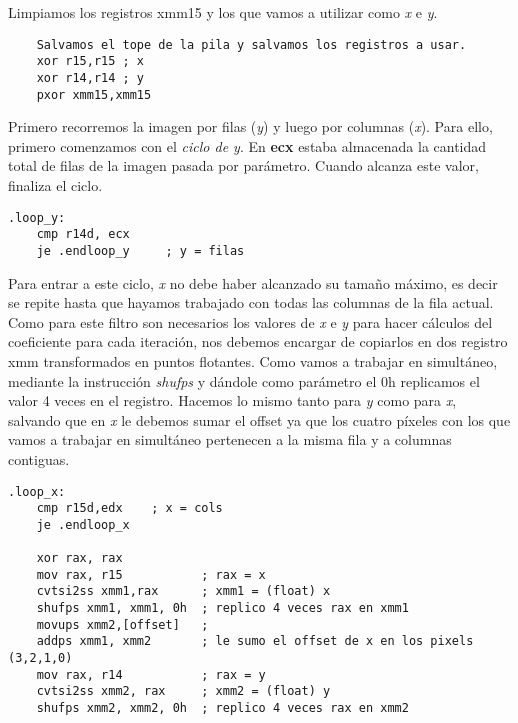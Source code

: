 \documentclass[a4paper]{article}
\begin{document}
\indent Limpiamos los registros xmm15 y los que vamos a utilizar como \emph{x} e \emph{y}.
 \begin{codesnippet}
\begin{verbatim}
    Salvamos el tope de la pila y salvamos los registros a usar.
    xor r15,r15 ; x
    xor r14,r14 ; y
    pxor xmm15,xmm15
\end{verbatim}
\end{codesnippet}

\indent Primero recorremos la imagen por filas (\emph{y}) y luego por columnas (\emph{x}). Para ello, primero comenzamos con el \textit{ciclo de y}. En \textbf{ecx} estaba almacenada la cantidad total de filas de la imagen pasada por par\'ametro. Cuando alcanza este valor, finaliza el ciclo.
 \begin{codesnippet}
\begin{verbatim}
.loop_y:
    cmp r14d, ecx
    je .endloop_y     ; y = filas
\end{verbatim}
\end{codesnippet}

\indent Para entrar a este ciclo, \emph{x} no debe haber alcanzado su tama\~no m\'aximo, es decir se repite hasta que hayamos trabajado con todas las columnas de la fila actual. Como para este filtro son necesarios los valores de \emph{x} e \emph{y} para hacer c\'alculos del coeficiente para cada iteraci\'on, nos debemos encargar de copiarlos en dos registro xmm transformados en puntos flotantes. Como vamos a trabajar en simult\'aneo, mediante la instrucci\'on \textit{shufps} y d\'andole como par\'ametro el 0h replicamos el valor 4 veces en el registro. Hacemos lo mismo tanto para \emph{y} como para \emph{x}, salvando que en \emph{x} le debemos sumar el offset ya que los cuatro p\'ixeles con los que vamos a trabajar en simult\'aneo pertenecen a la misma fila y a columnas contiguas. 
 \begin{codesnippet}
\begin{verbatim}
.loop_x:
    cmp r15d,edx    ; x = cols
    je .endloop_x

    xor rax, rax 
    mov rax, r15           ; rax = x
    cvtsi2ss xmm1,rax      ; xmm1 = (float) x
    shufps xmm1, xmm1, 0h  ; replico 4 veces rax en xmm1
    movups xmm2,[offset]   ; 
    addps xmm1, xmm2       ; le sumo el offset de x en los pixels (3,2,1,0)
    mov rax, r14           ; rax = y
    cvtsi2ss xmm2, rax     ; xmm2 = (float) y
    shufps xmm2, xmm2, 0h  ; replico 4 veces rax en xmm2
\end{verbatim}
\end{codesnippet}
\end{document}
